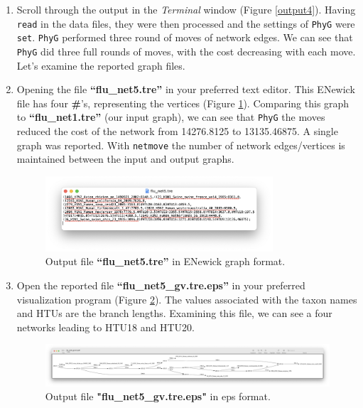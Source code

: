 \documentclass[11pt]{article}
\newcommand{\phyg}{\texttt{PhyG} }
\begin{document}
\begin {enumerate}
\item Scroll through the output in the \textit{Terminal} window (Figure \ref{output4}). 
Having \texttt{read} in the data files, they were then processed and the settings of 
\phyg were \texttt{set}. \phyg performed three round of moves of network edges.
We can see that \phyg did three full rounds of moves, with the cost decreasing 
with each move.\\

Let's examine the reported graph files. 

\item Opening the file \textbf{``flu\_net5.tre''} in your preferred text editor. This 
ENewick file has four \textbf{\#}'s, representing the vertices (Figure \ref{tre5}). 
Comparing this graph to \textbf{``flu\_net1.tre''} (our input graph), we can see 
that \phyg the moves reduced the cost of the network from 14276.8125 to 
13135.46875. A single graph was reported. With \texttt{netmove} the number 
of network edges/vertices is maintained between the input and output graphs.

\begin{figure}[H]
\centering
\includegraphics[width=0.8\textwidth]{tre5.png}
\caption{Output file \textbf{``flu\_net5.tre''} in ENewick graph format.}
\label{tre5}
\end{figure}

\item  Open the reported file \textbf{``flu\_net5\_gv.tre.eps''} in your preferred
visualization program (Figure \ref{eps5}). The values associated with the taxon 
names and HTUs are the branch lengths. Examining this file, we can see a four
networks leading to HTU18 and HTU20.

\begin{figure}[H]
\centering
\includegraphics[width=\textwidth]{eps5.png}
\caption{Output file \textbf{"flu\_net5\_gv.tre.eps"} in eps format.}
\label{eps5}
\end{figure}


\end{enumerate}
\end{document}
